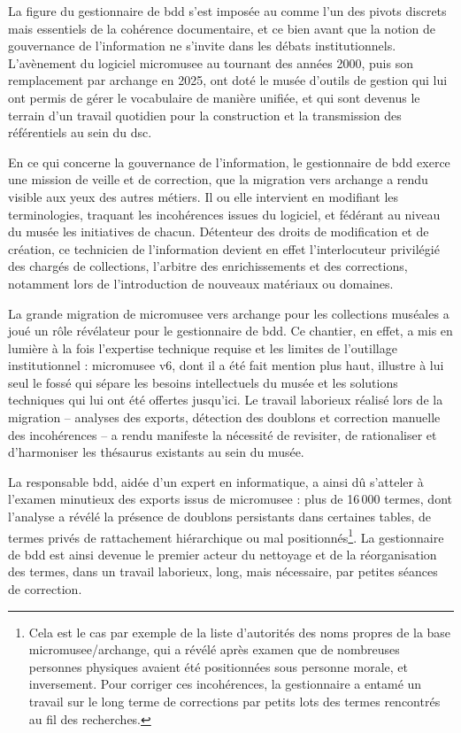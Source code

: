 La figure du gestionnaire de \gls{bdd} s’est imposée au \mae comme l’un des pivots discrets mais essentiels de la cohérence documentaire, et ce bien avant que la notion de gouvernance de l’information ne s’invite dans les débats institutionnels. L’avènement du logiciel \gls{micromusee} au tournant des années 2000, puis son remplacement par \gls{archange} en 2025, ont doté le musée d’outils de gestion qui lui ont permis de gérer le vocabulaire de manière unifiée, et qui sont devenus le terrain d’un travail quotidien pour la construction et la transmission des référentiels au sein du \ac{dsc}.

En ce qui concerne la gouvernance de l'information, le gestionnaire de \gls{bdd} exerce une mission de veille et de correction, que la migration vers \gls{archange} a rendu visible aux yeux des autres métiers. Il ou elle intervient en modifiant les terminologies, traquant les incohérences issues du logiciel, et fédérant au niveau du musée les initiatives de chacun. Détenteur des droits de modification et de création, ce technicien de l’information devient en effet l’interlocuteur privilégié des chargés de collections, l'arbitre des enrichissements et des corrections, notamment lors de l’introduction de nouveaux matériaux ou domaines.

La grande migration de \gls{micromusee} vers \gls{archange} pour les collections muséales a joué un rôle révélateur pour le gestionnaire de \gls{bdd}. Ce chantier, en effet, a mis en lumière à la fois l’expertise technique requise et les limites de l’outillage institutionnel : \gls{micromusee} v6, dont il a été fait mention plus haut, illustre à lui seul le fossé qui sépare les besoins intellectuels du musée et les solutions techniques qui lui ont été offertes jusqu'ici. Le travail laborieux réalisé lors de la migration -- analyses des exports, détection des doublons et correction manuelle des incohérences -- a rendu manifeste la nécessité de revisiter, de rationaliser et d'harmoniser les thésaurus existants au sein du musée.

La responsable \gls{bdd}, aidée d'un expert en informatique, a ainsi dû s'atteler à l’examen minutieux des exports issus de \gls{micromusee} : plus de 16\,000 termes, dont l’analyse a révélé la présence de doublons persistants dans certaines tables, de termes privés de rattachement hiérarchique ou mal positionnés\footnote{Cela est le cas par exemple de la liste d'autorités des noms propres de la base \gls{micromusee}/\gls{archange}, qui a révélé après examen que de nombreuses personnes physiques avaient été positionnées sous personne morale, et inversement. Pour corriger ces incohérences, la gestionnaire a entamé un travail sur le long terme de corrections par petits lots des termes rencontrés au fil des recherches.}. La gestionnaire de \gls{bdd} est ainsi devenue le premier acteur du nettoyage et de la réorganisation des termes, dans un travail laborieux, long, mais nécessaire, par petites séances de correction.


